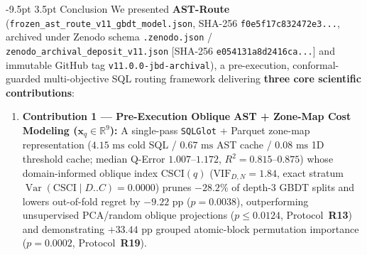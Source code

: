 \documentclass[10pt,a4paper]{article}
\makeatletter
\renewcommand\section{\@startsection{section}{1}{\z@}%
  {-9.5pt \@plus -2pt \@minus -1.5pt}%
  {3.5pt \@plus 1pt}%
  {\normalfont\large\bfseries}}
\makeatother
\begin{document}
\section{Conclusion}
\enlargethispage{1.5\baselineskip}
\vspace{-3pt}
We presented \textbf{AST-Route} (\texttt{frozen\_ast\_route\_v11\_gbdt\_model.json}, SHA-256 \texttt{f0e5f17c832472e3...}, archived under Zenodo schema \texttt{.zenodo.json} / \texttt{zenodo\_archival\_deposit\_v11.json} [SHA-256 \texttt{e054131a8d2416ca...}] and immutable GitHub tag \texttt{v11.0.0-jbd-archival}), a pre-execution, conformal-guarded multi-objective SQL routing framework delivering \textbf{three core scientific contributions}:
\begin{enumerate}[leftmargin=1.5em,itemsep=1.5pt]
    \item \textbf{Contribution 1 --- Pre-Execution Oblique AST + Zone-Map Cost Modeling ($\mathbf{x}_q\in\mathbb{R}^9$):} A single-pass \texttt{SQLGlot} + Parquet zone-map representation ($4.15\text{ ms}$ cold SQL / $0.67\text{ ms}$ AST cache / $0.08\text{ ms}$ 1D threshold cache; median Q-Error $1.007\text{--}1.172$, $R^2=0.815\text{--}0.875$) whose domain-informed oblique index $\text{CSCI}(q)$ ($\text{VIF}_{D,N}=1.84$, exact stratum $\operatorname{Var}(\text{CSCI}\mid D..C)=0.0000$) prunes $-28.2\%$ of depth-3 GBDT splits and lowers out-of-fold regret by $-9.22\text{ pp}$ ($p=0.0038$), outperforming unsupervised PCA/random oblique projections ($p\le 0.0124$, Protocol~\textbf{R13}) and demonstrating $+33.44\text{ pp}$ grouped atomic-block permutation importance ($p=0.0002$, Protocol~\textbf{R19}).

\end{enumerate}
\end{document}
